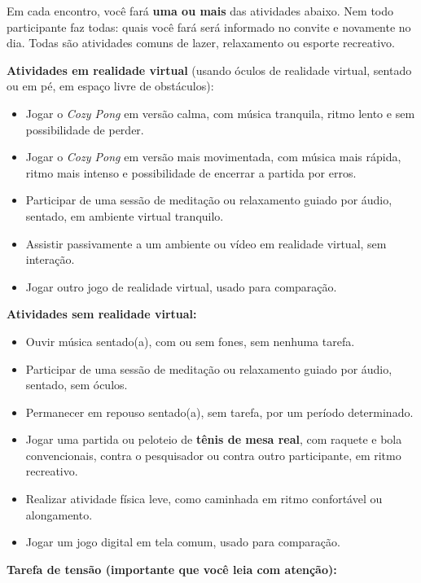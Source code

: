 \documentclass[12pt,a4paper]{article}
\begin{document}
Em cada encontro, você fará \textbf{uma ou mais} das atividades abaixo. Nem todo
participante faz todas: quais você fará será informado no convite e novamente no
dia. Todas são atividades comuns de lazer, relaxamento ou esporte recreativo.

\textbf{Atividades em realidade virtual} (usando óculos de realidade virtual,
sentado ou em pé, em espaço livre de obstáculos):

\begin{itemize}
  \item[\textbf{a)}] Jogar o \textit{Cozy Pong} em versão calma, com música tranquila, ritmo lento e sem possibilidade de perder.
  \item[\textbf{b)}] Jogar o \textit{Cozy Pong} em versão mais movimentada, com música mais rápida, ritmo mais intenso e possibilidade de encerrar a partida por erros.
  \item[\textbf{c)}] Participar de uma sessão de meditação ou relaxamento guiado por áudio, sentado, em ambiente virtual tranquilo.
  \item[\textbf{d)}] Assistir passivamente a um ambiente ou vídeo em realidade virtual, sem interação.
  \item[\textbf{e)}] Jogar outro jogo de realidade virtual, usado para comparação.
\end{itemize}

\textbf{Atividades sem realidade virtual:}

\begin{itemize}
  \item[\textbf{f)}] Ouvir música sentado(a), com ou sem fones, sem nenhuma tarefa.
  \item[\textbf{g)}] Participar de uma sessão de meditação ou relaxamento guiado por áudio, sentado, sem óculos.
  \item[\textbf{h)}] Permanecer em repouso sentado(a), sem tarefa, por um período determinado.
  \item[\textbf{i)}] Jogar uma partida ou peloteio de \textbf{tênis de mesa real}, com raquete e bola convencionais, contra o pesquisador ou contra outro participante, em ritmo recreativo.
  \item[\textbf{j)}] Realizar atividade física leve, como caminhada em ritmo confortável ou alongamento.
  \item[\textbf{k)}] Jogar um jogo digital em tela comum, usado para comparação.
\end{itemize}

\textbf{Tarefa de tensão (importante que você leia com atenção):}
\end{document}
